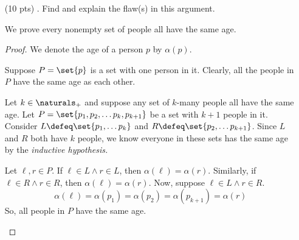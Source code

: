 \begin{enumerate}

  \item[(10 pts) \quad 1.]
    Find and explain the flaw(s) in this argument.
    \begin{mdframed}
      We prove every nonempty set of people all have the same age.
      \begin{proof}
        We denote the age of a person $p$ by $\alpha(p)$.

        \begin{case}
          Suppose $P = \set{p}$ is a set with one person in it.
          Clearly, all the people in $P$ have the same age as each other.
        \end{case}
        \begin{case}
          Let $k \in \naturals_+$ and suppose any set of $k$-many people all have the same age.
          Let $P = \set{p_1, p_2, \dots p_k, p_{k + 1}}$ be a set with $k + 1$ people in it.
          Consider $L \defeq \set{p_1, \dots p_k}$ and $R \defeq \set{p_2, \dots p_{k + 1}}$.
          Since $L$ and $R$ both have $k$ people, we know everyone in these sets has the same age by the \emph{inductive hypothesis.}

          Let $\ell, r \in P$.
          If $\ell \in L \land r \in L$, then $\alpha(\ell) = \alpha(r)$.
          Similarly, if $\ell \in R \land r \in R$, then $\alpha(\ell) = \alpha(r)$.
          Now, suppose $\ell \in L \land r \in R$.
          \begin{equation*}
            \alpha(\ell) = \alpha(p_1) = \alpha(p_2) = \alpha(p_{k + 1}) = \alpha(r)
          \end{equation*}
          So, all people in $P$ have the same age.
        \end{case}


\end{proof}
\end{mdframed}
\end{enumerate}

